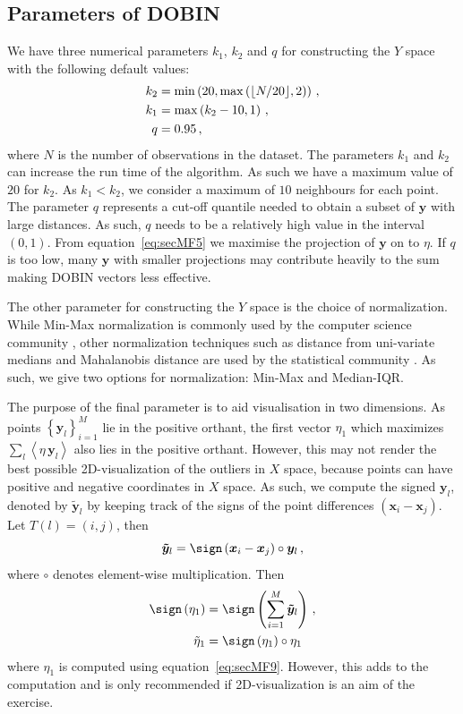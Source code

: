 \documentclass[a4paper,11pt]{article}
\begin{document}
\subsection{Parameters of DOBIN}\label{sec:MathFrame4}
We have three numerical parameters $k_1$, $k_2$ and $q$ for constructing the $Y$ space with the following default values:
\begin{align} \label{eq:secMF15}
   k_2  & = \min\left(20, \max \left( \lfloor N/20 \rfloor ,2 \right )  \right) \notag  \, , \\
   k_1  & = \max \left( k_2-10, 1 \right) \, , \\
   q    & = 0.95 \notag \, ,
\end{align}
where $N$ is the number of observations in the dataset. The parameters $k_1$ and $k_2$ can increase the run time of the algorithm. As such we have a maximum value of $20$ for $k_2$.  As $k_1 < k_2$, we consider a maximum of $10$ neighbours for each point. The parameter $q$ represents a  cut-off quantile needed to obtain a subset of $\bm{y}$ with large distances. As such, $q$ needs to be a relatively high value in the interval $(0,1)$. From equation~\eqref{eq:secMF5} we maximise the projection of $\bm{y}$ on to $\eta$. If $q$ is too low, many $\bm{y}$ with smaller projections may contribute heavily to the sum making DOBIN vectors less effective.

The other parameter for constructing the $Y$ space is the choice of normalization. While Min-Max normalization is commonly used by the computer science community \citep{campos2016evaluation}, other normalization techniques such as distance from uni-variate medians and Mahalanobis distance are used by the statistical community \citep{billor2000bacon}.  As such, we give two options for normalization: Min-Max and Median-IQR.

The purpose of the final parameter is to aid visualisation in two dimensions. As points $ \left\{ \bm{y}_{l} \right \}_{i=1}^M$ lie in the positive orthant, the first vector $\eta_1$ which maximizes $\sum_l \left\langle \eta\, \bm{y}_l \right\rangle$ also lies in the positive orthant. However, this may not render the best possible 2D-visualization of the outliers in $X$ space, because points can have positive and negative coordinates in  $X$ space. As such, we compute the signed $\bm{y}_{l}$, denoted by $\bm{\tilde{y}}_l$ by keeping track of the signs of the point differences $\left( \bm{x}_i - \bm{x}_j \right)$. Let $T(l) = \left( i, j \right)$, then
\begin{equation}\label{eq:secMF16}
    \bm{\tilde{y}}_l = \sign\left( \bm{x}_i - \bm{x}_j \right) \circ \bm{y}_{l}  \, ,
\end{equation}
where $\circ$ denotes element-wise multiplication. Then
\begin{align}\label{eq:secMF17}
    \sign \left(\eta_1 \right) & = \sign \left( \sum_{i=1}^M  \bm{\tilde{y}}_l \right) \, , \notag \\
    \tilde\eta_1 & = \sign \left(\eta_1 \right) \circ \eta_1
\end{align}
 where $\eta_1 $ is computed using equation~\eqref{eq:secMF9}. However, this adds to the computation and is only recommended if 2D-visualization is an aim of the exercise.
\end{document}
